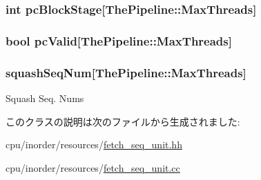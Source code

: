 \label{classFetchSeqUnit_a61bb24b7355c86288cba2cd9d51ad1ed}
\hypertarget{classFetchSeqUnit_acd6cfe08097e99df8b2ef586c47d87fa}{
\subsubsection[{pcBlockStage}]{\setlength{\rightskip}{0pt plus 5cm}int {\bf pcBlockStage}\mbox{[}{\bf ThePipeline::MaxThreads}\mbox{]}}}
\label{classFetchSeqUnit_acd6cfe08097e99df8b2ef586c47d87fa}
\hypertarget{classFetchSeqUnit_ae0f86f031bb34b0540e5ebcfaa2de630}{
\subsubsection[{pcValid}]{\setlength{\rightskip}{0pt plus 5cm}bool {\bf pcValid}\mbox{[}{\bf ThePipeline::MaxThreads}\mbox{]}}}
\label{classFetchSeqUnit_ae0f86f031bb34b0540e5ebcfaa2de630}
\hypertarget{classFetchSeqUnit_a8c48389ee147811c1be413cdd4be4b68}{
\subsubsection[{squashSeqNum}]{ {\bf squashSeqNum}\mbox{[}{\bf ThePipeline::MaxThreads}\mbox{]}}}
\label{classFetchSeqUnit_a8c48389ee147811c1be413cdd4be4b68}
Squash Seq. Nums 

このクラスの説明は次のファイルから生成されました:\begin{DoxyCompactItemize}
\item 
cpu/inorder/resources/\hyperlink{fetch__seq__unit_8hh}{fetch\_\-seq\_\-unit.hh}\item 
cpu/inorder/resources/\hyperlink{fetch__seq__unit_8cc}{fetch\_\-seq\_\-unit.cc}\end{DoxyCompactItemize}
